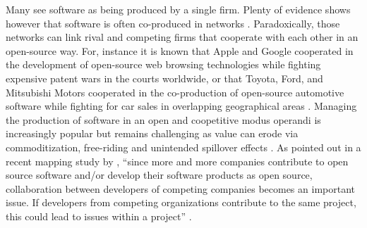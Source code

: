 \documentclass[CHICAGO,Times1COL]{WileyNJDv5} %
\begin{document}
% 
% 

Many see software as being produced by a single firm. Plenty of evidence shows however that software  is often co-produced in networks 
\citep[see][]{LundbackKarlsson2005,dyer1998relational,lavie2006competitive,NietoSantamaria2007,QiDongMcCarthy_et_al2017}.
Paradoxically,  those networks can link rival and competing firms that cooperate with each other in an open-source way. For, instance it is known that Apple and Google cooperated in the development of open-source web browsing technologies while fighting expensive patent wars in the courts worldwide, or that Toyota, Ford, and Mitsubishi Motors cooperated in the co-production of open-source automotive software while fighting for car sales in overlapping geographical areas \citep{TeixeiraLin2014,teixeira2023icis}.   Managing the production of software in an open and coopetitive modus operandi is increasingly popular \citep{teixeira2023icis,CzakonSrivastava_et_al2020} but remains challenging as value can erode via commoditization, free-riding and unintended spillover effects \citep{GnyawaliPark2011,HattoriYoshikawa2016,TeixeiraMian_et_al2016}. As pointed out in a recent mapping study by \citep{HerboldAmirfallah_et_al2021}, ``since more and more companies contribute to open source software and/or develop their software products as open
source,  collaboration between developers of competing companies becomes an important issue.
If developers from competing organizations contribute to the same project, this could lead to issues within a project'' \citep[][]{HerboldAmirfallah_et_al2021}.  
\end{document}
